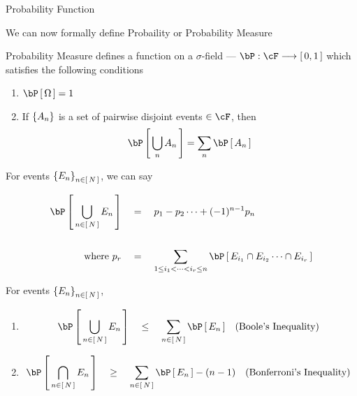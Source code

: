 \documentclass{article}
\begin{document}
\begin{ssection}{Probability Function}

	We can now formally define Probaility or Probability Measure

	\begin{definition}
		Probability Measure defines a function on a $\sigma$-field --- $\bP : \cF \lra \brac{0, 1}$ which satisfies the following conditions

		\begin{enumerate}
			\item $\prob{\Omega} = 1$
			\item If $\left\{ {A_n} \right\}$ is a set of pairwise disjoint events $\in \cF$, then 
				\begin{align*}
					\prob{\bigcup_{n} A_n} = \sum_n \prob{A_n}
				\end{align*}
		\end{enumerate}
		\label{def:prob_measure}
	\end{definition}

	\begin{result}
		For events $\left\{ {E_n} \right\}_{n \in \left[\,{N}\,\right]}$, we can say

		\begin{align*}
			\prob{\bigcup_{n \in \brac{N}} E_n}	&\eq	p_1 - p_2 \dots + (-1)^{n - 1} p_n \\
			\\
			\mt{where} p_r						&\eq	\sum_{1 \le i_1 < \dots < i_r \le n} \prob{E_{i_1} \cap E_{i_2} \dots \cap E_{i_r}}
		\end{align*}
	\end{result}

	\begin{result}
		For events $\left\{ {E_n} \right\}_{n \in \left[\,{N}\,\right]}$,

		\begin{enumerate}[label=(\roman*)]
			\item 
				\begin{align*}
					\prob{\bigcup_{n \in \brac{N}} E_n}	\qle	\sum_{n \in \brac{N}} \prob{E_n}			&&\mt{(Boole's Inequality)}
				\end{align*}
			\item 
				\begin{align*}
					\prob{\bigcap_{n \in \brac{N}} E_n}	\qge	\sum_{n \in \brac{N}} \prob{E_n} - (n - 1)	&&\mt{(Bonferroni's Inequality)}
				\end{align*}
		\end{enumerate}
	\end{result}
	

\end{ssection}
\end{document}
